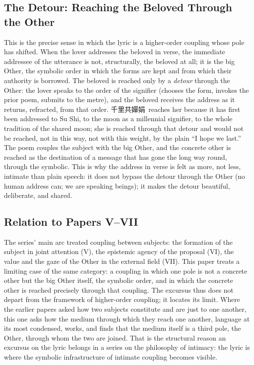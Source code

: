 \subsection{The Detour: Reaching the Beloved Through the Other}

This is the precise sense in which the lyric is a higher-order coupling whose pole has shifted. When the lover addresses the beloved in verse, the immediate addressee of the utterance is not, structurally, the beloved at all; it is the big Other, the symbolic order in which the forms are kept and from which their authority is borrowed. The beloved is reached only by a \emph{detour} through the Other: the lover speaks to the order of the signifier (chooses the form, invokes the prior poem, submits to the metre), and the beloved receives the address as it returns, refracted, from that order. \cjkfont 千里共嬋娟\normalfont\ reaches her because it has first been addressed to Su Shi, to the moon as a millennial signifier, to the whole tradition of the shared moon; she is reached through that detour and would not be reached, not in this way, not with this weight, by the plain ``I hope we last.'' The poem couples the subject with the big Other, and the concrete other is reached as the destination of a message that has gone the long way round, through the symbolic. This is why the address in verse is felt as more, not less, intimate than plain speech: it does not bypass the detour through the Other (no human address can; we are speaking beings); it makes the detour beautiful, deliberate, and shared.

\subsection{Relation to Papers V--VII}

The series' main arc treated coupling between subjects: the formation of the subject in joint attention (V), the epistemic agency of the proposal (VI), the value and the gaze of the Other in the external field (VII). This paper treats a limiting case of the same category: a coupling in which one pole is not a concrete other but the big Other itself, the symbolic order, and in which the concrete other is reached precisely through that coupling. The excursus thus does not depart from the framework of higher-order coupling; it locates its limit. Where the earlier papers asked how two subjects constitute and are just to one another, this one asks how the medium through which they reach one another, language at its most condensed, works, and finds that the medium itself is a third pole, the Other, through whom the two are joined. That is the structural reason an excursus on the lyric belongs in a series on the philosophy of intimacy: the lyric is where the symbolic infrastructure of intimate coupling becomes visible.

